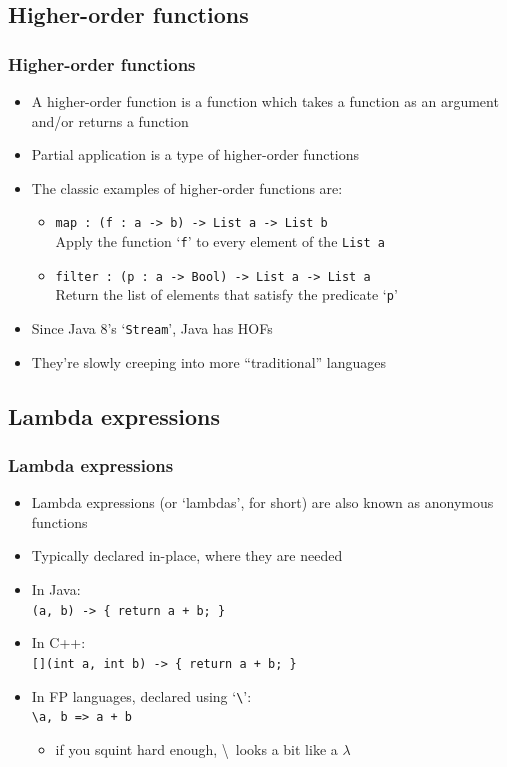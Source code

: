 \documentclass{beamer}
\begin{document}
  \subsection{Higher-order functions}
  \begin{frame}
    \frametitle{Higher-order functions}

    \begin{itemize}
      \item A higher-order function is a function which takes a function as an
            argument and/or returns a function
      \item Partial application is a type of higher-order functions
      \item The classic examples of higher-order functions are:
        \begin{itemize}
          \item \texttt{map : (f : a -> b) -> List a -> List b}\\
                Apply the function `\texttt{f}' to every element of the
                \texttt{List a}
          \item \texttt{filter : (p : a -> Bool) -> List a -> List a}\\
                Return the list of elements that satisfy the predicate
                `\texttt{p}'
        \end{itemize}
      \item Since Java 8's `\texttt{Stream}', Java has HOFs
      \item They're slowly creeping into more ``traditional'' languages
    \end{itemize}
  \end{frame}

  \subsection{Lambda expressions}
  \begin{frame}
    \frametitle{Lambda expressions}

    \begin{itemize}
      \item Lambda expressions (or `lambdas', for short) are also known as
            anonymous functions
      \item Typically declared in-place, where they are needed
      \item In Java:\\
            {\footnotesize \texttt{(a, b) -> \{ return a + b; \}}}
      \item In C++:\\
            {\footnotesize \texttt{[](int a, int b) -> \{ return a + b; \}}}
      \item In FP languages, declared using `\texttt{\textbackslash}':\\
            {\footnotesize \texttt{\textbackslash a, b => a + b}}
        \begin{itemize}
          \item if you squint hard enough, \textbackslash\ looks a bit like
                a $\lambda$
        \end{itemize}
    \end{itemize}
  \end{frame}
\end{document}
